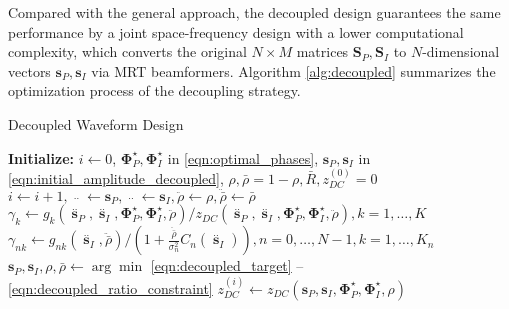 Compared with the general approach, the decoupled design guarantees the same performance by a joint space-frequency design with a lower computational complexity, which converts the original $N \times M$ matrices ${{{\mathbf{S}}_P},{{\mathbf{S}}_I}}$ to $N$-dimensional vectors ${{{\mathbf{s}}_P},{{\mathbf{s}}_I}}$ via MRT beamformers. Algorithm \ref{alg:decoupled} summarizes the optimization process of the decoupling strategy.

\begin{algorithm}
  \caption{Decoupled Waveform Design}
  \label{alg:decoupled}
  \begin{algorithmic}[1]
    \State \textbf{Initialize:} $i \leftarrow 0$, ${\mathbf{\Phi }}_P^ \star ,{\mathbf{\Phi }}_I^ \star $ in \eqref{eqn:optimal_phases}, ${{{\mathbf{s}}_P},{{\mathbf{s}}_I}}$ in \eqref{eqn:initial_amplitude_decoupled}, $\rho ,\bar \rho  = 1 - \rho ,\bar R,z_{DC}^{(0)} = 0$
    \Repeat
      \State $i \leftarrow i + 1,\mathop {{{\mathbf{s}}_P}}\limits^{..}  \leftarrow {{\mathbf{s}}_P},\mathop {{{\mathbf{s}}_P}}\limits^{..}  \leftarrow {{\mathbf{s}}_I},\ddot \rho  \leftarrow \rho ,\ddot{\bar{\rho}}  \leftarrow \bar \rho $
      \State ${\gamma _k} \leftarrow {g_k}\left( {{{\mathop {\mathbf{s}}\limits^{..} }_P},{{\mathop {\mathbf{s}}\limits^{..} }_I},{\mathbf{\Phi }}_P^ \star ,{\mathbf{\Phi }}_I^ \star ,\ddot \rho } \right)/{z_{DC}}\left( {{{\mathop {\mathbf{s}}\limits^{..} }_P},{{\mathop {\mathbf{s}}\limits^{..} }_I},{\mathbf{\Phi }}_P^ \star ,{\mathbf{\Phi }}_I^ \star ,\ddot \rho } \right),k = 1, \ldots ,K$
      \State ${\gamma _{nk}} \leftarrow {g_{nk}}\left( {{{\mathop {\mathbf{s}}\limits^{..} }_I},\ddot{\bar{\rho}} } \right)/\left( {1 + \frac{{\ddot{\bar{\rho}} }}{{\sigma _n^2}}{C_n}\left( {{{\mathop {\mathbf{s}}\limits^{..} }_I}} \right)} \right),n = 0, \ldots ,N - 1,k = 1, \ldots ,{K_n}$
      \State ${{\mathbf{s}}_P},{{\mathbf{s}}_I},\rho ,\bar \rho  \leftarrow \arg \min $ \eqref{eqn:decoupled_target} -- \eqref{eqn:decoupled_ratio_constraint}
      \State $z_{DC}^{(i)} \leftarrow {z_{DC}}\left( {{{\mathbf{s}}_P},{{\mathbf{s}}_I},{\mathbf{\Phi }}_P^ \star ,{\mathbf{\Phi }}_I^ \star ,\rho } \right)$
  \end{algorithmic}
\end{algorithm}



